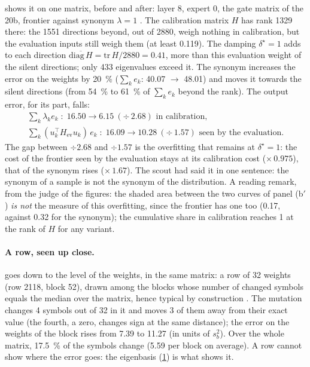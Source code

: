  shows it on one matrix, before and after: layer 8, expert 0, the gate matrix of the 20b, frontier against synonym $\lambda = 1$ \mes. The calibration matrix $H$ has rank \num{1329} there: the \num{1551} directions beyond, out of \num{2880}, weigh nothing in calibration, but the evaluation inputs still weigh them (at least \num{0.119}). The damping $\delta^\star = 1$ adds to each direction $\overline{\mathrm{diag}\,H} = \mathrm{tr}\,H/\num{2880} = \num{0.41}$, more than this evaluation weight of the silent directions; only \num{433} eigenvalues exceed it. The synonym increases the error on the weights by \SI{20}{\percent} ($\sum_k e_k$: \num{40.07} $\to$ \num{48.01}) and moves it towards the silent directions (from \SI{54}{\percent} to \SI{61}{\percent} of $\sum_k e_k$ beyond the rank). The output error, for its part, falls:
\begin{gather*}
\textstyle\sum_k \lambda_k e_k \;:\; \num{16.50} \to \num{6.15}\ (\div\,\num{2.68}) \text{ in calibration,}\\
\textstyle\sum_k (u_k^\top H_{\text{ev}} u_k)\, e_k \;:\; \num{16.09} \to \num{10.28}\ (\div\,\num{1.57}) \text{ seen by the evaluation.}
\end{gather*}
The gap between $\div 2.68$ and $\div 1.57$ is the overfitting that remains at $\delta^\star = 1$: the cost of the frontier seen by the evaluation stays at its calibration cost ($\times\,\num{0.975}$), that of the synonym rises ($\times\,\num{1.67}$). The scout had said it in one sentence: the synonym of a sample is not the synonym of the distribution. A reading remark, from the judge of the figures: the shaded area between the two curves of panel (b$'$) \emph{is not} the measure of this overfitting, since the frontier has one too (\num{0.17}, against \num{0.32} for the synonym); the cumulative share in calibration reaches 1 at the rank of $H$ for any variant.

\begin{figure}[tbp]
\centering
\GrapheSynoBasePropre
{}
\label{fig:t3-syno-base-propre}
\end{figure}

\paragraph{A row, seen up close.}  goes down to the level of the weights, in the same matrix: a row of 32 weights (row \num{2118}, block 52), drawn among the blocks whose number of changed symbols equals the median over the matrix, hence typical by construction \mes. The mutation changes 4 symbols out of 32 in it and moves 3 of them away from their exact value (the fourth, a zero, changes sign at the same distance); the error on the weights of the block rises from \num{7.39} to \num{11.27} (in units of $s_b^2$). Over the whole matrix, \SI{17.5}{\percent} of the symbols change (\num{5.59} per block on average). A row cannot show where the error goes: the eigenbasis (\cref{fig:t3-syno-base-propre}) is what shows it.

